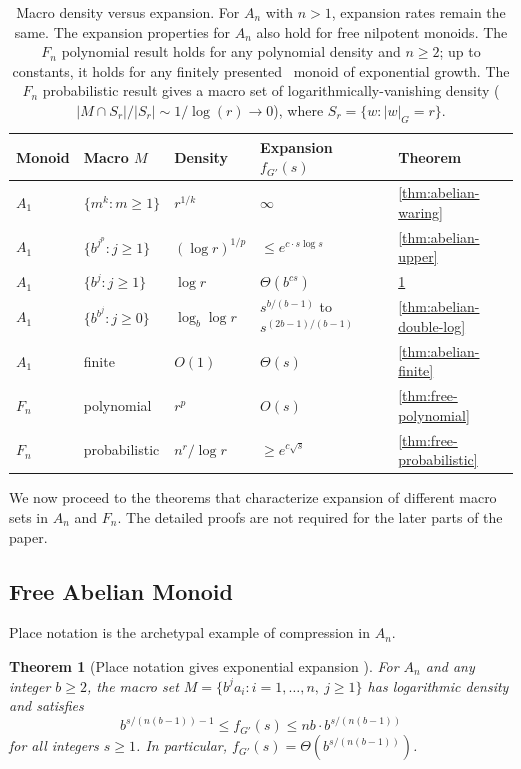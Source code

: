 \documentclass[12pt]{amsart}
\newtheorem{theorem}{Theorem}
\theoremstyle{definition}
\theoremstyle{remark}
\begin{document}
\begin{table}[ht]
\centering
\begin{tabular}{lllll}
\hline
Monoid & Macro $M$ & Density & Expansion $f_{G'}(s)$ & Theorem \\
\hline
$A_1$ & $\{m^k : m \geq 1\}$ & $r^{1/k}$ & $\infty$ & \ref{thm:abelian-waring} \\
$A_1$ & $\{b^{j^p} : j \geq 1\}$ & $(\log r)^{1/p}$ & $\leq e^{c \cdot s \log s}$ & \ref{thm:abelian-upper} \\
$A_1$ & $\{b^j : j \geq 1\}$ & $\log r$ & $\Theta(b^{cs})$ & \ref{thm:abelian-place} \\
$A_1$ & $\{b^{b^j} : j \geq 0\}$ & $\log_b \log r$ & $s^{b/(b-1)}$ to $s^{(2b-1)/(b-1)}$ & \ref{thm:abelian-double-log} \\$A_1$ & finite & $O(1)$ & $\Theta(s)$ & \ref{thm:abelian-finite} \\
\hline
$F_n$ & polynomial & $r^p$ & $O(s)$ & \ref{thm:free-polynomial} \\
$F_n$ & probabilistic & $n^r/\log r$ & $\geq e^{c\sqrt{s}}$ & \ref{thm:free-probabilistic} \\
\hline
\end{tabular}
\caption{Macro density versus expansion. For $A_n$ with $n > 1$, expansion rates remain the same. 
The expansion properties for $A_n$ also hold for free nilpotent monoids.
The $F_n$ polynomial result holds for any polynomial density and $n \geq 2$; up to constants, it holds for any finitely presented \ monoid of exponential growth. The $F_n$ probabilistic result gives a macro set of logarithmically-vanishing density ($|M \cap S_r|/|S_r| \sim 1/\log(r) \to 0$), where $S_r = \{w : |w|_G = r\}$.}
\label{tab:main-results}
\end{table}

We now proceed to the theorems that characterize expansion of different macro sets in $A_n$ and $F_n$.
The detailed proofs are not required for the later parts of the paper.

\subsection{Free Abelian Monoid}

Place notation is the archetypal example of compression in $A_n$.

\begin{theorem}[Place notation gives exponential expansion ]\label{thm:abelian-place}
For $A_n$ and any integer $b \geq 2$, the macro set $M = \{ b^j a_i : i = 1, \ldots, n, \ j \geq 1 \}$ has logarithmic density and satisfies
\[
b^{s/(n(b-1)) - 1} \leq f_{G'}(s) \leq nb \cdot b^{s/(n(b-1))}
\]
for all integers $s \geq 1$.
In particular, $f_{G'}(s) = \Theta(b^{s/(n(b-1))})$.
\end{theorem}
\end{document}
